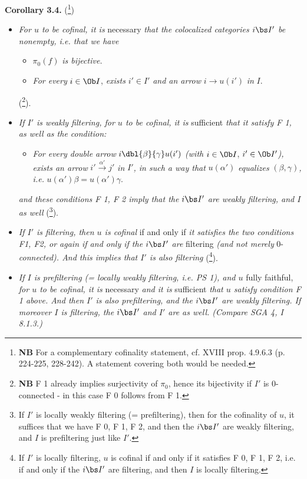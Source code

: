 \noindent\textbf{Corollary 3.4.} (\footnote[55]{\textbf{NB} For a complementary cofinality statement, cf. XVIII prop. 4.9.6.3 (p. 224-225, 228-242). A statement covering both would be needed.})
\begin{itemize}[label={}]
\item[\textit{a)}] \textit{For $u$ to be cofinal, it is} necessary \textit{that the colocalized categories $i\bs I'$ be nonempty, i.e. that we have}

\begin{itemize}[label={}]
\item[\textit{F 0)}] $\pi_0(f)$ \textit{is bijective.}
\item[\textit{F 1)}] \textit{For every} $i \in \Ob I$, \textit{exists} $i' \in I'$ \textit{and an arrow} $i \longrightarrow u(i')$ \textit{in} $I$.
\end{itemize}
(\footnote[56]{\textbf{NB} F 1 already implies surjectivity of $\pi_0$, hence its bijectivity if $I'$ is 0-connected - in this case F 0 follows from F 1.}).
\item[\textit{b)}] \textit{If $I'$ is weakly filtering, for $u$ to be cofinal, it is} sufficient \textit{that it satisfy F 1, as well as the condition:}
\begin{itemize}[label={}]
\item[\textit{F 2)}] \textit{For every double arrow} $i \dbl{\beta}{\gamma} u(i')$ \textit{(with} $i \in \Ob I$, $i' \in \Ob I'$\textit{),} \textit{exists an arrow} $i' \xrightarrow{\alpha'} j'$ \textit{in} $I'$\textit{, in such a way that} $u(\alpha')$ \textit{equalizes} $(\beta, \gamma)$\textit{, i.e.} $u(\alpha')\beta = u(\alpha')\gamma$.
\end{itemize}
\textit{and these conditions F 1, F 2 imply that the $i\bs I'$ are weakly filtering, and $I$ as well} (\footnote[57]{If $I'$ is locally weakly filtering (= prefiltering), then for the cofinality of $u$, it suffices that we have F 0, F 1, F 2, and then the $i\bs I'$ are weakly filtering, and $I$ is prefiltering just like $I'$.}).

\item[\textit{c)}] \textit{If $I'$ is filtering, then $u$ is cofinal} if and only if \textit{it satisfies the two conditions F1, F2, or again if and only if the $i\bs I'$ are} filtering \textit{(and not merely} 0-\textit{connected). And this implies that $I'$ is also filtering} (\footnote[58]{If $I'$ is locally filtering, $u$ is cofinal if and only if it satisfies F 0, F 1, F 2, i.e. if and only if the $i\bs I'$ are filtering, and then $I$ is locally filtering.}).
\item[\textit{d)}] \textit{If $I$ is prefiltering (= locally weakly filtering, i.e. PS 1), and $u$} fully faithful, \textit{for $u$ to be cofinal, it is} necessary \textit{and it is} sufficient \textit{that $u$ satisfy condition F 1 above. And then $I'$ is also prefiltering, and the $i\bs I'$ are weakly filtering. If moreover $I$ is filtering, the $i\bs I'$ and $I'$ are as well. (Compare SGA 4, I 8.1.3.)}
\end{itemize}

